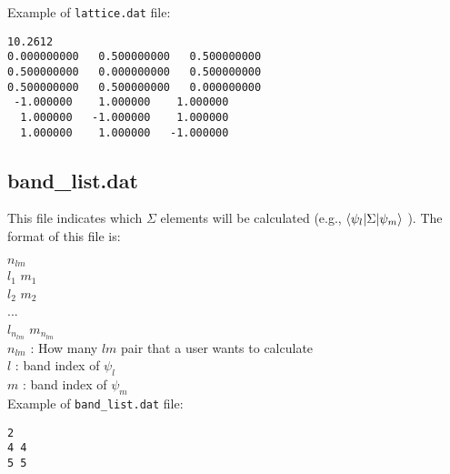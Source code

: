 \documentclass[letterpaper,12pt]{article}
\newcommand{\note}[1]{{\bf \large \color{red} #1}}
\begin{document}

Example of \verb+lattice.dat+ file:

\verb+10.2612+\\
\verb+0.000000000   0.500000000   0.500000000+\\
\verb+0.500000000   0.000000000   0.500000000+\\
\verb+0.500000000   0.500000000   0.000000000+\\
\verb+ -1.000000    1.000000    1.000000+\\
\verb+  1.000000   -1.000000    1.000000+\\
\verb+  1.000000    1.000000   -1.000000+\\

\newpage
\subsection{band\_list.dat}

This file indicates which $\Sigma$ elements will be calculated (e.g., $\braket{\psi_l|\Sigma|\psi_m}$ ). The format of this file is: 

$n_{lm}$\\
$l_1$ $m_1$\\
$l_2$ $m_2$\\
...\\
$l_{n_{lm}}$ $m_{n_{lm}}$\\

$n_{lm}$ : How many $lm$ pair that a user wants to calculate\\
$l$ : band index of $\psi_l$\\
$m$ : band index of $\psi_m$ \\

Example of \verb+band_list.dat+ file:

\verb+2+\\
\verb+4 4+\\
\verb+5 5+\\


\end{document}
